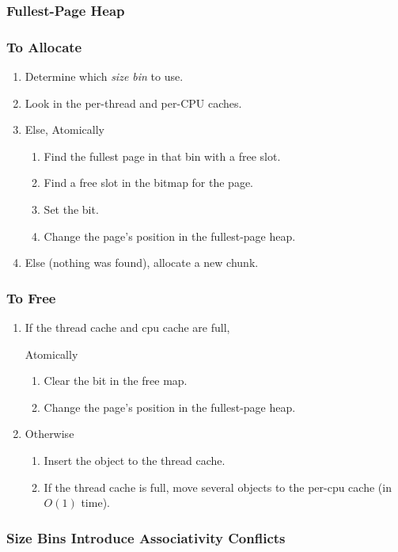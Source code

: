 \documentclass[xcolor=dvipsnames,14pt]{beamer}
\begin{document}
\begin{frame}
\frametitle{Fullest-Page Heap}

\end{frame}

\begin{frame}
\frametitle{To Allocate}


\begin{enumerate}
\item Determine which \textit{size bin} to use.
\item Look in the per-thread and per-CPU caches.
\item Else, Atomically 
  \begin{enumerate}
  \item Find the fullest page in that bin with a free slot.
  \item Find a free slot in the bitmap for the page.
  \item Set the bit.
  \item Change the page's position in the fullest-page heap.
  \end{enumerate}
\item Else (nothing was found), allocate a new chunk.
\end{enumerate}
\end{frame}

\begin{frame}
\frametitle{To Free}
\begin{enumerate}
\item If the thread cache and cpu cache are full, 

 Atomically
 \begin{enumerate}
 \item Clear the bit in the free map.
 \item Change the page's position in the fullest-page heap.
 \end{enumerate}
\item Otherwise 
 \begin{enumerate}
 \item Insert the object to the thread cache.
 \item If the thread cache is full, move several objects to the per-cpu cache (in $O(1)$ time).
 \end{enumerate}
\end{enumerate}
\end{frame}

\begin{frame}
\frametitle{Size Bins Introduce Associativity Conflicts}

\end{frame}
\end{document}
